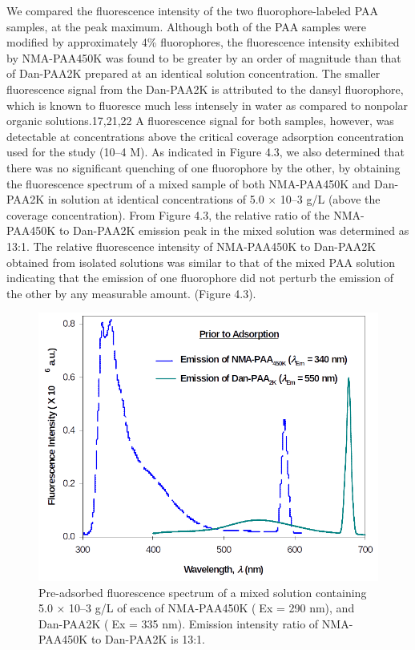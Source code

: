 \documentclass[journal=jacsat,manuscript=article]{achemso}
\begin{document}
We compared the fluorescence intensity of the two fluorophore-labeled PAA samples, at the peak maximum.  Although both of the PAA samples were modified by approximately 4\% fluorophores, the fluorescence intensity exhibited by NMA-PAA450K was found to be greater by an order of magnitude than that of Dan-PAA2K prepared at an identical solution concentration.  The smaller fluorescence signal from the Dan-PAA2K is attributed to the dansyl fluorophore, which is known to fluoresce much less intensely in water as compared to nonpolar organic solutions.17,21,22  A fluorescence signal for both samples, however, was detectable at concentrations above the critical coverage adsorption concentration used for the study (10–4 M).  As indicated in Figure 4.3, we also determined that there was no significant quenching of one fluorophore by the other, by obtaining the fluorescence spectrum of a mixed sample of both NMA-PAA450K and Dan-PAA2K in solution at identical concentrations of 5.0 × 10–3 g/L (above the coverage concentration).  From Figure 4.3, the relative ratio of the NMA-PAA450K to Dan-PAA2K emission peak in the mixed solution was determined as 13:1.  The relative fluorescence intensity of NMA-PAA450K to Dan-PAA2K obtained from isolated solutions was similar to that of the mixed PAA solution indicating that the emission of one fluorophore did not perturb the emission of the other by any measurable amount. (Figure 4.3).

\begin{figure}[H]
\includegraphics[scale=2.0]{fig3.png}
\caption{Pre-adsorbed fluorescence spectrum of a mixed solution containing 5.0 × 10–3 g/L of each of NMA-PAA450K (Ex = 290 nm), and Dan-PAA2K (Ex = 335 nm).  Emission intensity ratio of NMA-PAA450K to Dan-PAA2K  is 13:1.}
\label{figure 3}
\end{figure}
\end{document}

